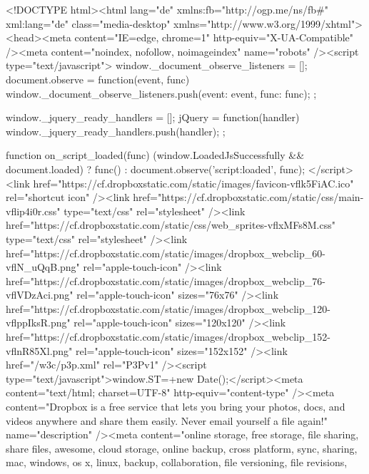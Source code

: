 <!DOCTYPE html><html lang="de" xmlns:fb="http://ogp.me/ns/fb#" xml:lang="de" class="media-desktop" xmlns="http://www.w3.org/1999/xhtml"><head><meta content="IE=edge, chrome=1" http-equiv="X-UA-Compatible" /><meta content="noindex, nofollow, noimageindex" name="robots" /><script type="text/javascript">
                window._document_observe_listeners = [];
                document.observe = function(event, func) {
                    window._document_observe_listeners.push({event: event, func: func});
                };

                window._jquery_ready_handlers = [];
                jQuery = function(handler) {
                    window._jquery_ready_handlers.push(handler);
                };

                function on_script_loaded(func) {
                    (window.LoadedJsSuccessfully && document.loaded) ? func() : document.observe('script:loaded', func);
                }
                </script> <link href="https://cf.dropboxstatic.com/static/images/favicon-vflk5FiAC.ico" rel="shortcut icon" /><link href="https://cf.dropboxstatic.com/static/css/main-vflip4i0r.css" type="text/css" rel="stylesheet" /><link href="https://cf.dropboxstatic.com/static/css/web_sprites-vflxMFs8M.css" type="text/css" rel="stylesheet" /><link href="https://cf.dropboxstatic.com/static/images/dropbox_webclip_60-vflN_uQqB.png" rel="apple-touch-icon" /><link href="https://cf.dropboxstatic.com/static/images/dropbox_webclip_76-vflVDzAci.png" rel="apple-touch-icon" sizes="76x76" /><link href="https://cf.dropboxstatic.com/static/images/dropbox_webclip_120-vflppIksR.png" rel="apple-touch-icon" sizes="120x120" /><link href="https://cf.dropboxstatic.com/static/images/dropbox_webclip_152-vflnR85Xl.png" rel="apple-touch-icon" sizes="152x152" /><link href="/w3c/p3p.xml" rel="P3Pv1" /><script type="text/javascript">window.ST=+new Date();</script><meta content="text/html; charset=UTF-8" http-equiv="content-type" /><meta content="Dropbox is a free service that lets you bring your photos, docs, and videos anywhere and share them easily. Never email yourself a file again!" name="description" /><meta content="online storage, free storage, file sharing, share files,
    awesome, cloud storage, online backup, cross platform, sync, sharing, mac,
    windows, os x, linux, backup, collaboration, file versioning, file revisions,
